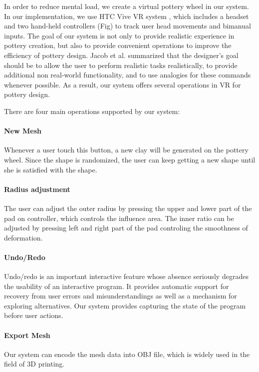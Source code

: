 In order to reduce mental load, we create a virtual pottery wheel in our system.
In our implementation, we use HTC Vive VR system \cite{website:vive}, which includes a headset and two hand-held controllers (Fig) to track user head movements and bimanual inputs.
The goal of our system is not only to provide realistic experience in pottery creation, but also to provide convenient operations to improve the efficiency of pottery design. 
Jacob et al. \cite{Jacob2008Reality} summarized that the designer's goal should be to allow the user to perform realistic tasks realistically, to provide additional non real-world functionality, and to use analogies for these commands whenever possible.
As a result, our system offers several operations in VR for pottery design.


There are four main operations supported by our system:

\paragraph{New Mesh}
Whenever a user touch this button, a new clay will be generated on the pottery wheel. Since the shape is randomized, the user can keep getting a new shape until she is satisfied with the shape.

\paragraph{Radius adjustment}
The user can adjust the outer radius by pressing the upper and lower part of the pad on controller, which controls the influence area. The inner ratio can be adjusted by pressing left and right part of the pad controling the smoothness of deformation.


\paragraph{Undo/Redo}
Undo/redo is an important interactive feature whose absence seriously degrades the usability of an interactive program.\cite{choudhary1995general} It provides automatic support for recovery from user errors and misunderstandings as well as a mechanism for exploring alternatives. Our system provides capturing the state of the program before user actions.

\paragraph{Export Mesh}
Our system can encode the mesh data into OBJ file, which is widely used in the field of 3D printing.

